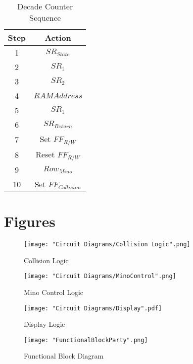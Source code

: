 \documentclass[letterpaper,titlepage,oneside]{article}
\begin{document}
\begin{table}[h!]

\begin{center}
\begin{tabular}{c|c}

\hline 
\rule[-1ex]{0pt}{2.5ex} Step & Action \\ 
\hline 
\rule[-1ex]{0pt}{2.5ex} 1 & $SR_{State}$ \\ 
\hline 
\rule[-1ex]{0pt}{2.5ex} 2 & $SR_{1}$ \\ 
\hline 
\rule[-1ex]{0pt}{2.5ex} 3 & $SR_{2}$ \\ 
\hline 
\rule[-1ex]{0pt}{2.5ex} 4 & $RAM Address$ \\ 
\hline 
\rule[-1ex]{0pt}{2.5ex} 5 & $SR_{1}$ \\ 
\hline 
\rule[-1ex]{0pt}{2.5ex} 6 & $SR_{Return}$ \\ 
\hline 
\rule[-1ex]{0pt}{2.5ex} 7 & Set $FF_{R/W}$ \\ 
\hline 
\rule[-1ex]{0pt}{2.5ex} 8 & Reset $FF_{R/W}$ \\ 
\hline 
\rule[-1ex]{0pt}{2.5ex} 9 & $Row_{Mino}$ \\ 
\hline 
\rule[-1ex]{0pt}{2.5ex} 10 & Set $FF_{Collision}$ \\ 
\hline 


\end{tabular} 
\end{center}\caption{Decade Counter Sequence}\label{table:Clock}
\end{table}


\clearpage
\section{Figures}
\begin{figure}[h!]
\begin{center}
\texttt{[image: "Circuit Diagrams/Collision Logic".png]}
\caption{Collision Logic}
\label{fig:Collision}
\end{center}
\end{figure}

\begin{figure}[h!]
\begin{center}
\texttt{[image: "Circuit Diagrams/MinoControl".png]}
\caption{Mino Control Logic}
\label{fig:Mino Control}
\end{center}
\end{figure}

\begin{figure}[h!]
\begin{center}
\texttt{[image: "Circuit Diagrams/Display".pdf]}
\caption{Display Logic}
\label{fig:Display}
\end{center}
\end{figure}

\begin{figure}[h!]
\begin{center}
\texttt{[image: "FunctionalBlockParty".png]}
\caption{Functional Block Diagram}
\label{fig:block}
\end{center}
\end{figure}

\clearpage
\end{document}
